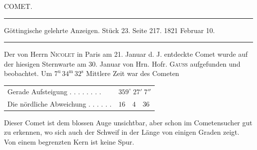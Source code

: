 \clearpage
{}
\hypertarget{native-440-part-lower}{}
\begin{center}
{\large COMET.}
\end{center}

\begin{center}
\noindent\rule{\linewidth}{0.4pt}

Göttingische gelehrte Anzeigen. Stück 23. Seite 217. 1821 Februar 10.

\noindent\rule{\linewidth}{0.4pt}
\end{center}

Der von Herrn \textsc{Nicolet} in Paris am 21. Januar d. J. entdeckte Comet wurde auf
der hiesigen Sternwarte am 30. Januar von Hrn. Hofr. \textsc{Gauss} aufgefunden und
beobachtet. Um $7^{\mathrm{u}}\,34^{\mathrm{m}}\,32^{\mathrm{s}}$ Mittlere Zeit war des
Cometen

\begin{center}
\begin{tabular}{ll}
Gerade Aufsteigung . . . . . . . . & $359^\circ\;27'\;7''$ \\
Die nördliche Abweichung . . . . . . & $16\quad4\quad36$ \\
\end{tabular}
\end{center}

Dieser Comet ist dem blossen Auge unsichtbar, aber schon im Cometensucher gut zu
erkennen, wo sich auch der Schweif in der Länge von einigen Graden zeigt. Von einem
begrenzten Kern ist keine Spur.
